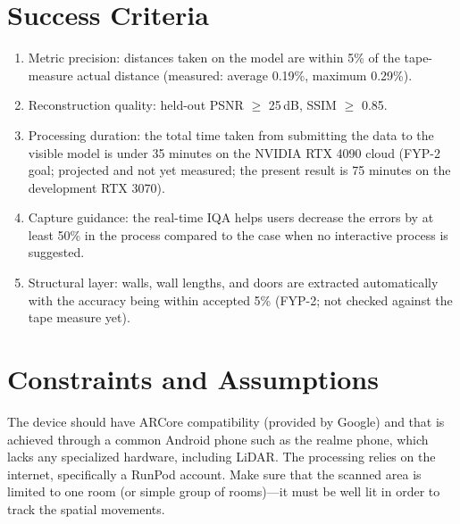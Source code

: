 \section{Success Criteria}
\label{sec:success}
\begin{enumerate}
    \item Metric precision: distances taken on the model are within 5\% of the tape-measure actual distance (measured: average 0.19\%, maximum 0.29\%).
    \item Reconstruction quality: held-out PSNR $\geq$ 25\,dB, SSIM $\geq$ 0.85.
    \item Processing duration: the total time taken from submitting the data to the visible model is under 35 minutes on the NVIDIA RTX 4090 cloud (FYP-2 goal; projected and not yet measured; the present result is 75 minutes on the development RTX 3070).
    \item Capture guidance: the real-time IQA helps users decrease the errors by at least 50\% in the process compared to the case when no interactive process is suggested.
    \item Structural layer: walls, wall lengths, and doors are extracted automatically with the accuracy being within accepted 5\% (FYP-2; not checked against the tape measure yet).
\end{enumerate}

\section{Constraints and Assumptions}
The device should have ARCore compatibility (provided by Google) and that is achieved through a common Android phone such as the realme phone, which lacks any specialized hardware, including LiDAR. The processing relies on the internet, specifically a RunPod account. Make sure that the scanned area is limited to one room (or simple group of rooms)---it must be well lit in order to track the spatial movements.

